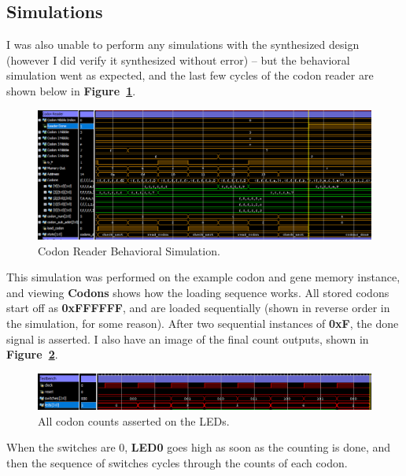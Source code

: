 \documentclass[a4paper, 12pt]{article}
\begin{document}
\begin{landscape}
\section{Simulations}
I was also unable to perform any simulations with the synthesized design (however I did verify it synthesized without error) -- but the behavioral simulation went as expected, and the last few cycles of the codon reader are shown below in \textbf{Figure~\ref{fig:behav-codon-reader}}.

\begin{figure}[H]
\centering
\includegraphics[width=0.85\paperheight, keepaspectratio=true]{Sources/codon_reader.PNG}
\caption{Codon Reader Behavioral Simulation.}
\label{fig:behav-codon-reader}
\end{figure}

This simulation was performed on the example codon and gene memory instance, and viewing \textbf{Codons} shows how the loading sequence works. All stored codons start off as \textbf{0xFFFFFF}, and are loaded sequentially (shown in reverse order in the simulation, for some reason). After two sequential instances of \textbf{0xF}, the done signal is asserted. I also have an  image of the final count outputs, shown in \textbf{Figure~\ref{fig:behav-count-leds}}.

\begin{figure}[H]
\centering
\includegraphics[width=0.85\paperheight, keepaspectratio=true]{Sources/switch_outputs.png}
\caption{All codon counts asserted on the LEDs.}
\label{fig:behav-count-leds}
\end{figure}

When the switches are 0, \textbf{LED0} goes high as soon as the counting is done, and then the sequence of switches cycles through the counts of each codon.
\end{landscape}
\end{document}
